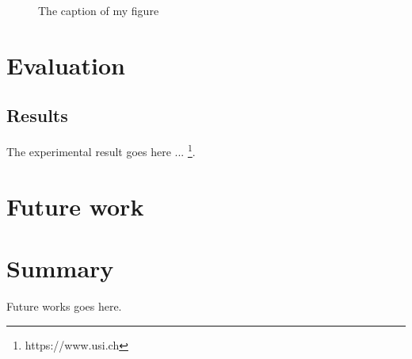 \documentclass[a4paper]{usiinfbachelorproject}
\begin{document}
\begin{figure}[h!]
    \caption{The caption of my figure}\label{fig:flower}
\end{figure}




\section{\textbf{Evaluation}}
\subsection{\textbf{Results}}
The experimental result goes here ... \footnote{https://www.usi.ch}. \\







\newpage
\section{\textbf{Future work}}

\section{\textbf{Summary}}
Future works goes here.






\newpage



\end{document}
